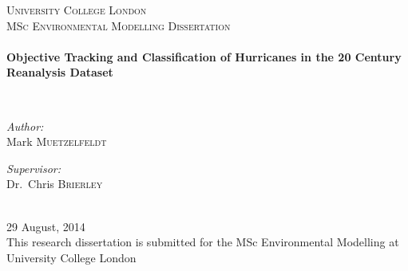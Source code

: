 \begin{titlepage}

\begin{center}

\textsc{\LARGE University College London}\\[1.5cm]

\textsc{\Large MSc Environmental Modelling Dissertation}\\[0.5cm]

\HRule \\[0.4cm]
{ \LARGE \bfseries Objective Tracking and Classification of Hurricanes in the 20 Century Reanalysis Dataset \\[0.4cm] }

\HRule \\[1.5cm]

\begin{minipage}{0.4\textwidth}
\begin{flushleft} \large
\emph{Author:}\\
Mark \textsc{Muetzelfeldt}
\end{flushleft}
\end{minipage}
\begin{minipage}{0.4\textwidth}
\begin{flushright} \large
\emph{Supervisor:} \\
Dr.~Chris \textsc{Brierley}
\end{flushright}
\end{minipage}
\\[0.5cm]
29 August, 2014
\\[0.5cm]

This research dissertation is submitted for the MSc Environmental Modelling at University College London


\vfill

\end{center}

\end{titlepage}
